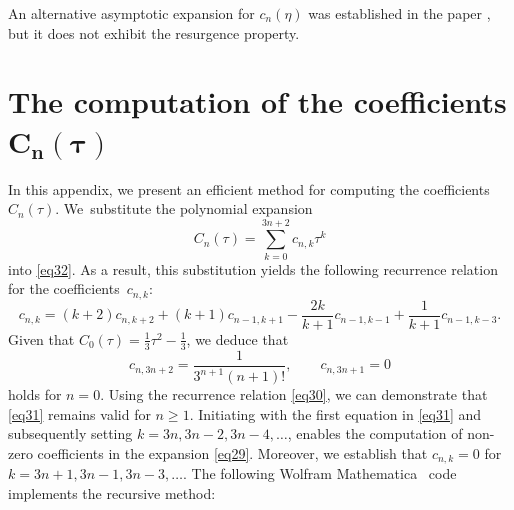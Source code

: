 \documentclass[pdftex]{sigma}
\numberwithin{equation}{section}
\begin{document}
An alternative asymptotic expansion for $c_n (\eta)$ was established in the paper \cite{Dunster1998}, but it does not exhibit the resurgence property.

\section[The computation of the coefficients C\_n(tau)]{The computation of the coefficients $\boldsymbol{C_n(\tau)}$}\label{appendixb}

In this appendix, we present an efficient method for computing the coefficients $C_n(\tau)$. We~substitute the polynomial expansion
\begin{equation}\label{eq29}
C_n(\tau) = \sum_{k=0}^{3n+2} c_{n,k}\tau^k
\end{equation}
into \eqref{eq32}. As a result, this substitution yields the following recurrence relation for the coefficients~$c_{n,k}$:
\begin{equation}\label{eq30}
c_{n,k}=(k+2)c_{n,k+2}+(k+1) c_{n-1,k+1}-\frac{2k}{k+1}c_{n-1,k-1}+\frac{1}{k+1}c_{n-1,k-3}.
\end{equation}
Given that $C_0 (\tau ) = \frac{1}{3}\tau^2 -\frac{1}{3}$, we deduce that
\begin{equation}\label{eq31}
c_{n,3n+2}=\frac{1}{3^{n+1}(n+1)!},\qquad c_{n,3n+1}=0
\end{equation}
holds for $n=0$. Using the recurrence relation \eqref{eq30}, we can demonstrate that \eqref{eq31} remains valid for $n\geq1$. Initiating with the first equation in \eqref{eq31} and subsequently setting $k=3n, 3n-2, \allowbreak 3n-4, \dots$, enables the computation of non-zero coefficients in the expansion \eqref{eq29}. Moreover, we establish that $c_{n,k}=0$ for $k=3n+1, 3n-1, 3n-3, \dots$. The following Wolfram Mathematica~\cite{Mathematica} code implements the recursive method:
\end{document}
